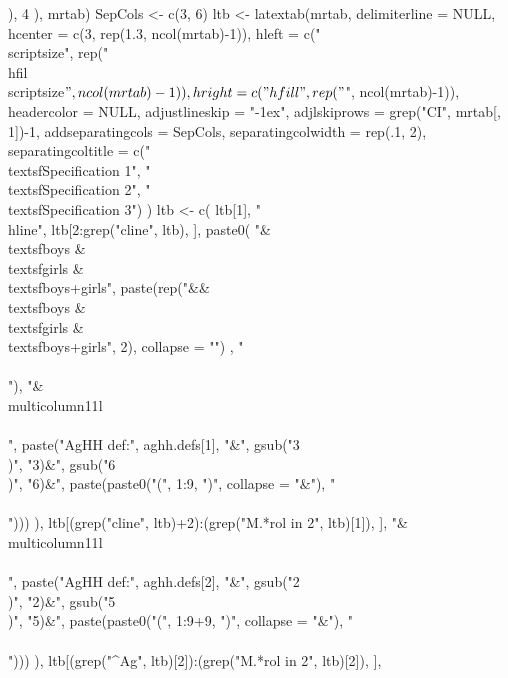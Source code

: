 \begin{Schunk}
\begin{Sinput}
{{             ), 4
          ), 
       mrtab)
    SepCols <- c(3, 6) 
    ltb <- latextab(mrtab, delimiterline = NULL, 
        hcenter = c(3, rep(1.3, ncol(mrtab)-1)),
        hleft = c("\\scriptsize", rep("\\hfil\\scriptsize$", ncol(mrtab)-1)), 
        hright = c("\\hfill", rep("$", ncol(mrtab)-1)),
        headercolor = NULL, 
        adjustlineskip = "-1ex", adjlskiprows = grep("CI", mrtab[, 1])-1,
        addseparatingcols = SepCols, separatingcolwidth = rep(.1, 2), 
        separatingcoltitle = c("\\textsf{Specification 1}", "\\textsf{Specification 2}", "\\textsf{Specification 3}")
      ) 
    ltb <- c(
      ltb[1], "\\hline", 
      ltb[2:grep("cline", ltb), ],
      paste0(
        "&\\textsf{boys} & \\textsf{girls} & \\textsf{boys+girls}",
        paste(rep("&&\\textsf{boys} & \\textsf{girls} & \\textsf{boys+girls}", 2), collapse = "")
        , "\\\\"),
      "&\\multicolumn{11}{l}{}\\\\",
      paste("AgHH def:", aghh.defs[1], "&",
        gsub("3\\)", "3)&", gsub("6\\)", "6)&", paste(paste0("(", 1:9, ")", collapse = "&"), "\\\\")))
        ),
      ltb[(grep("cline", ltb)+2):(grep("M.*rol in 2", ltb)[1]), ], 
      "&\\multicolumn{11}{l}{}\\\\",
      paste("AgHH def:", aghh.defs[2], "&",
        gsub("2\\)", "2)&", gsub("5\\)", "5)&", paste(paste0("(", 1:9+9, ")", collapse = "&"), "\\\\")))
        ),
      ltb[(grep("^Ag", ltb)[2]):(grep("M.*rol in 2", ltb)[2]), ],
}}
\end{Sinput}
\end{Schunk}
